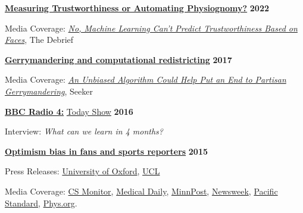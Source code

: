 \documentclass[10pt]{article}
\newenvironment{outerlist}[1][\enskip\textbullet]%
        {\begin{itemize}[#1]}{\end{itemize}%
         \vspace{-.6\baselineskip}}
\newenvironment{innerlist}[1][\enskip\textbullet]%
        {\begin{compactitem}[#1]}{\end{compactitem}}
\begin{document}
\begin{outerlist}

 \item[\textbf{\href{https://doi.org/10.48550/arXiv.2202.08674}{ Measuring Trustworthiness or Automating Physiognomy?}}] \hfill\textbf{2022}
\begin{innerlist}
	\item Media Coverage: \href{https://thedebrief.org/no-machine-learning-cant-predict-trustworthiness-based-on-faces/
}{\textit{No, Machine Learning Can’t Predict Trustworthiness Based on Faces}}, The Debrief
\end{innerlist}

 \item[\textbf{\href{https://dx.doi.org/10.1007/s42001-019-00053-9}{Gerrymandering and computational redistricting}}] \hfill\textbf{2017}
\begin{innerlist}
	\item Media Coverage: \href{https://www.seeker.com/tech/an-unbiased-algorithm-could-help-put-an-end-to-partisan-gerrymandering}{\textit{An Unbiased Algorithm Could Help Put an End to Partisan Gerrymandering}}, Seeker
\end{innerlist}

 \item[\textbf{\href{http://www.bbc.co.uk/radio4}{BBC Radio 4:}} \href{http://www.bbc.co.uk/programmes/b0713zdz}{Today Show}] \hfill\textbf{2016}
\begin{innerlist}
	\item Interview: \textit{What can we learn in 4 months?}
\end{innerlist}

\item[\textbf{\href{http://journals.plos.org/plosone/article?id=10.1371/journal.pone.0137685}{Optimism bias in fans and sports reporters}}] \hfill\textbf{2015}
\begin{innerlist}
  \item Press Releases: \href{http://www.ox.ac.uk/news/2015-09-09-nfl-fans-and-espn-reporters-overly-optimistic-about-team-prospects}{University of Oxford}, \href{https://www.ucl.ac.uk/news/news-articles/0915/100915-nfl-team-prospects}{UCL}
  \item Media Coverage: \href{http://www.csmonitor.com/Science/2015/0909/NFL-scores-Your-team-is-probably-less-invincible-than-you-imagine}{CS Monitor},
  \href{http://www.medicaldaily.com/rose-colored-glasses-nfl-fans-and-sports-reporters-overestimate-how-good-their-teams-351888}{Medical Daily},
  \href{https://www.minnpost.com/second-opinion/2015/09/why-football-fans-are-unrealistically-optimistic-and-why-it-matters}{MinnPost},
  \href{http://europe.newsweek.com/nfl-fans-and-reporters-overly-optimistic-about-teams-prospects-332758}{Newsweek},
  \href{http://www.psmag.com/health-and-behavior/this-study-explains-why-raiders-fans-continue-going-to-watch-their-team-play}{Pacific Standard},
  \href{http://phys.org/news/2015-09-nfl-fans-espn-overly-optimistic.html}{Phys.org}. 
\end{innerlist}
\end{outerlist}
\end{document}
